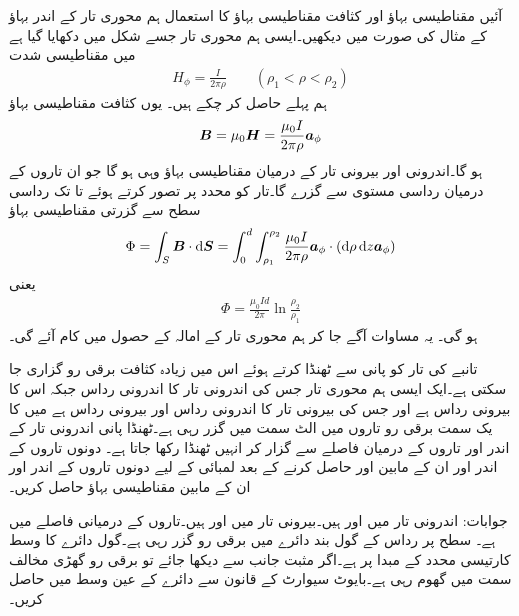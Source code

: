آئیں مقناطیسی بہاؤ اور کثافت مقناطیسی بہاؤ کا استعمال ہم محوری تار کے اندر بہاؤ کے مثال کی صورت میں دیکھیں۔ایسی ہم محوری تار جسے شکل  میں دکھایا گیا ہے میں مقناطیسی شدت
\begin{align*}
H_{\phi}=\frac{I}{2\pi \rho} \quad \quad (\rho_1 < \rho < \rho_2)
\end{align*}
ہم پہلے حاصل کر چکے ہیں۔ یوں کثافت مقناطیسی بہاؤ
\begin{align*}
{\ensuremath{{\boldsymbol{B}}}}=\mu_0 {{\boldsymbol{H}}}=\frac{\mu_0 I}{2\pi \rho} {\boldsymbol{a}}_{\phi}
\end{align*}
ہو گا۔اندرونی اور بیرونی تار کے درمیان مقناطیسی بہاؤ وہی ہو گا جو ان تاروں کے درمیان رداسی مستوی سے گزرے گا۔تار کو  محدد پر تصور کرتے ہوئے  تا  تک رداسی سطح سے گزرتی مقناطیسی بہاؤ
\begin{align*}
\Phi=\int_S \kvec{B} \cdot \dif \kvec{S}=\int_{0}^{d} \int_{\rho_1}^{\rho_2} \frac{\mu_0 I}{2\pi \rho} \aphi \cdot (\dif \rho \dif z \aphi)
\end{align*}
یعنی
\begin{align}
\Phi=\frac{\mu_0 I d}{2\pi} \ln \frac{\rho_2}{\rho_1}
\end{align}
ہو گی۔ یہ مساوات آگے جا کر ہم محوری تار کے امالہ کے حصول میں کام آئے گی۔

تانبے کی تار کو پانی سے ٹھنڈا کرتے ہوئے اس میں زیادہ کثافت برقی رو گزاری جا سکتی ہے۔ایک ایسی ہم محوری تار جس کی اندرونی تار کا اندرونی رداس  جبکہ اس کا بیرونی رداس  ہے اور جس کی بیرونی تار کا اندرونی رداس  اور بیرونی رداس  ہے میں  کا یک سمت برقی رو تاروں میں الٹ سمت میں گزر رہی ہے۔ٹھنڈا پانی اندرونی تار کے اندر اور تاروں کے درمیان فاصلے سے گزار کر انہیں ٹھنڈا رکھا جاتا ہے۔ دونوں تاروں کے اندر اور ان کے مابین  اور  حاصل کرنے کے بعد   لمبائی کے  لیے  دونوں تاروں کے اندر اور ان کے مابین  مقناطیسی بہاؤ حاصل کریں۔

جوابات: اندرونی تار میں  اور  ہیں۔بیرونی تار میں  اور  ہیں۔تاروں کے درمیانی فاصلے میں  ہے۔
 سطح پر  رداس کے گول بند دائرے میں  برقی رو گزر رہی ہے۔گول دائرے کا وسط کارتیسی محدد کے مبدا  پر ہے۔اگر مثبت  جانب  سے دیکھا جائے تو برقی رو گھڑی مخالف سمت میں گھوم رہی ہے۔بایوٹ سیوارٹ کے قانون سے دائرے کے عین وسط میں  حاصل کریں۔


